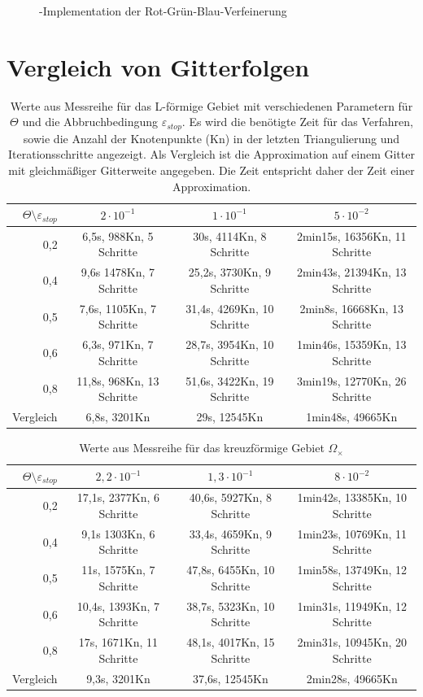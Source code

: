 \begin{figure}[!htbp]
	
	\caption{\label{redref} \matlab-Implementation der Rot-Grün-Blau-Verfeinerung}
\end{figure}
\newpage \newpage \newpage  
\section{Vergleich von Gitterfolgen}
\begin{table}[!htbp]
	\begin{tabular}{r|c|c|c}
		$\Theta\setminus\varepsilon_{stop}$& $2\cdot10^{-1}$ & $1\cdot10^{-1}$&$5\cdot10^{-2}$ \\
		\hline
		0,2&6,5s, 988Kn, 5 Schritte&30s, 4114Kn, 8 Schritte&2min15s, 16356Kn, 11 Schritte\\	
		0,4&9,6s 1478Kn, 7 Schritte&25,2s, 3730Kn, 9 Schritte&2min43s, 21394Kn,  13 Schritte\\
		0,5&7,6s, 1105Kn, 7 Schritte&31,4s, 4269Kn, 10 Schritte&2min8s, 16668Kn, 13 Schritte\\
		0,6&6,3s, 971Kn, 7 Schritte&28,7s, 3954Kn, 10 Schritte&1min46s, 15359Kn,  13 Schritte\\
		0,8&11,8s, 968Kn, 13 Schritte&51,6s, 3422Kn, 19 Schritte&3min19s, 12770Kn,  26 Schritte\\
		\hline
		Vergleich&6,8s, 3201Kn&29s, 12545Kn&1min48s, 49665Kn\\
	\end{tabular}
	\caption{\label{Test}Werte aus Messreihe für das L-förmige Gebiet mit verschiedenen Parametern für $\Theta$ und die Abbruchbedingung $\varepsilon_{stop}$. Es wird die benötigte Zeit für das Verfahren, sowie die Anzahl der Knotenpunkte (Kn) in der letzten Triangulierung und Iterationsschritte angezeigt. Als Vergleich ist die Approximation auf einem Gitter mit gleichmäßiger Gitterweite angegeben. Die Zeit entspricht daher der Zeit einer Approximation.}
\end{table}
\begin{table}[!htbp]
	\begin{tabular}{r|c|c|c}
		$\Theta\setminus\varepsilon_{stop}$& $2,2\cdot10^{-1}$ & $1,3\cdot10^{-1}$&$8\cdot10^{-2}$ \\
		\hline
		0,2&17,1s, 2377Kn, 6 Schritte&40,6s, 5927Kn, 8 Schritte&1min42s, 13385Kn, 10 Schritte\\	
		0,4&9,1s 1303Kn, 6 Schritte&33,4s, 4659Kn, 9 Schritte&1min23s, 10769Kn,  11 Schritte\\
		0,5&11s, 1575Kn, 7 Schritte&47,8s, 6455Kn, 10 Schritte&1min58s, 13749Kn, 12 Schritte\\
		0,6&10,4s, 1393Kn, 7 Schritte&38,7s, 5323Kn, 10 Schritte&1min31s, 11949Kn,  12 Schritte\\
		0,8&17s, 1671Kn, 11 Schritte&48,1s, 4017Kn, 15 Schritte&2min31s, 10945Kn,  20 Schritte\\
		\hline
		Vergleich&9,3s, 3201Kn&37,6s, 12545Kn&2min28s, 49665Kn\\
	\end{tabular}
	\caption{\label{Test2}Werte aus Messreihe für das kreuzförmige Gebiet $\Omega_\times$}
\end{table}

